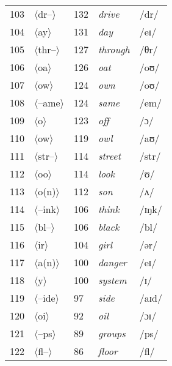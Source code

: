\begin{longtable}{lllll}
103 & $\langle$dr--$\rangle$ & 132 & \textit{drive} & /dr/ \\
104 & $\langle$ay$\rangle$ & 131 & \textit{day} & /eɪ/ \\
105 & $\langle$thr--$\rangle$ & 127 & \textit{through} & /θr/ \\
106 & $\langle$oa$\rangle$ & 126 & \textit{oat} & /oʊ/ \\
107 & $\langle$ow$\rangle$ & 124 & \textit{own} & /oʊ/ \\
108 & $\langle$--ame$\rangle$ & 124 & \textit{same} & /em/ \\
109 & $\langle$o$\rangle$ & 123 & \textit{off} & /ɔ/ \\
110 & $\langle$ow$\rangle$ & 119 & \textit{owl} & /aʊ/ \\
111 & $\langle$str--$\rangle$ & 114 & \textit{street} & /str/ \\
112 & $\langle$oo$\rangle$ & 114 & \textit{look} & /ʊ/ \\
113 & $\langle$o(n)$\rangle$ & 112 & \textit{son} & /ʌ/ \\
114 & $\langle$--ink$\rangle$ & 106 & \textit{think} & /ɪŋk/ \\
115 & $\langle$bl--$\rangle$ & 106 & \textit{black} & /bl/ \\
116 & $\langle$ir$\rangle$ & 104 & \textit{girl} & /ər/ \\
117 & $\langle$a(n)$\rangle$ & 100 & \textit{danger} & /eɪ/ \\
118 & $\langle$y$\rangle$ & 100 & \textit{system} & /ɪ/ \\
119 & $\langle$--ide$\rangle$ & 97 & \textit{side} & /aɪd/ \\
120 & $\langle$oi$\rangle$ & 92 & \textit{oil} & /ɔɪ/ \\
121 & $\langle$--ps$\rangle$ & 89 & \textit{groups} & /ps/ \\
122 & $\langle$fl--$\rangle$ & 86 & \textit{floor} & /fl/ \\
\hline
\end{longtable}

